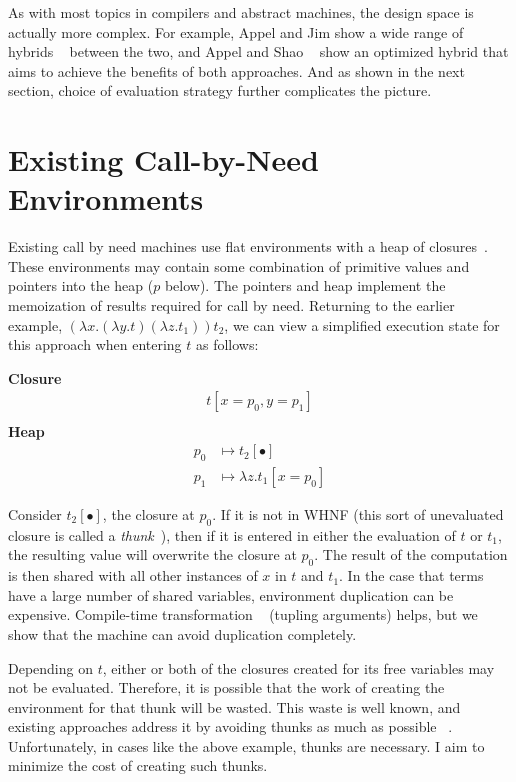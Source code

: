 As with most topics in compilers and abstract machines, the design space is
actually more complex. For example, Appel and Jim show a wide range of hybrids
~\cite{appel1988optimizing} between the two, and Appel and Shao
~\cite{shao1994space} show an optimized hybrid that aims to achieve the benefits
of both approaches. And as shown in the next section, choice of evaluation
strategy further complicates the picture.

\section{Existing Call-by-Need Environments} \label{sec:exist}

Existing call by need machines use flat environments with a heap of
closures~\cite{jonesstg,TIM,johnsson1984efficient,boquist1997grin}. These
environments may contain some combination of primitive values and pointers into the
heap ($p$ below). The pointers and heap implement the memoization of results
required for call by need. Returning to the earlier example, $(\lambda
x.(\lambda y.t) (\lambda z.t_1)) t_2$, we can view a simplified execution state
for this approach when entering $t$ as follows:

\begin{center}
\textbf{Closure}
\begin{align*}
t[x=p_0, y=p_1] \\
\end{align*}
\textbf{Heap}
\begin{align*}
p_0 &\mapsto t_2[\bullet] \\
p_1 &\mapsto \lambda z.t_1[x=p_0] 
\end{align*}
\end{center}

Consider $t_2[\bullet]$, the closure at $p_0$. If it is not in WHNF (this sort
of unevaluated closure is called a
\emph{thunk}~\cite{ingerman1961way,peyton1992implementing}), then if it is
entered in either the evaluation of $t$ or $t_1$, the resulting value will
overwrite the closure at $p_0$. The result of the computation is then shared
with all other instances of $x$ in $t$ and $t_1$. In the case that terms have a
large number of shared variables, environment duplication can be expensive.
Compile-time transformation ~\cite{peyton1992implementing} (tupling arguments)
helps, but we show that the machine can avoid duplication completely.

Depending on $t$, either or both of the closures created for its free variables
may not be evaluated. Therefore, it is possible that the work of creating the
environment for that thunk will be wasted. This waste is well known, and
existing approaches address it by avoiding thunks as much as possible
~\cite{jonesstg,johnsson1984efficient}. Unfortunately, in cases like the above
example, thunks are necessary. I aim to minimize the cost of creating such
thunks.

